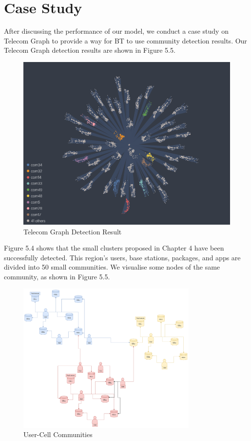 \documentclass[ %
                    author={Tengyao Tu},
                supervisor={Dr. James Pope},
                    degree={MSc},
                     title={A New Perspective on Graph Community Detection: Combining Traditional Methods with Deep Learning Approaches},
                  subtitle={Applying to Telecom Networks and Diverse Datasets},
                      type={},
                      year={2024}]{dissertation}
\begin{document}
\section{Case Study}
After discussing the performance of our model, we conduct a case study on Telecom Graph to provide a way for BT to use community detection results. Our Telecom Graph detection results are shown in Figure 5.5.
\begin{figure}[h] %
    \centering
    \includegraphics[width=1.0\textwidth]{Figure_12.png} %
    \caption{Telecom Graph Detection Result}
    \label{virtual Graph Data Map}
\end{figure}
Figure 5.4 shows that the small clusters proposed in Chapter 4 have been successfully detected. This region's users, base stations, packages, and apps are divided into 50 small communities. We visualise some nodes of the same community, as shown in Figure 5.5. 
\begin{figure}[h] %
    \centering
    \includegraphics[width=0.8\textwidth]{Figure_13.png} %
    \caption{User-Cell Communities}
    \label{virtual Graph Data Map}
\end{figure}
\end{document}
